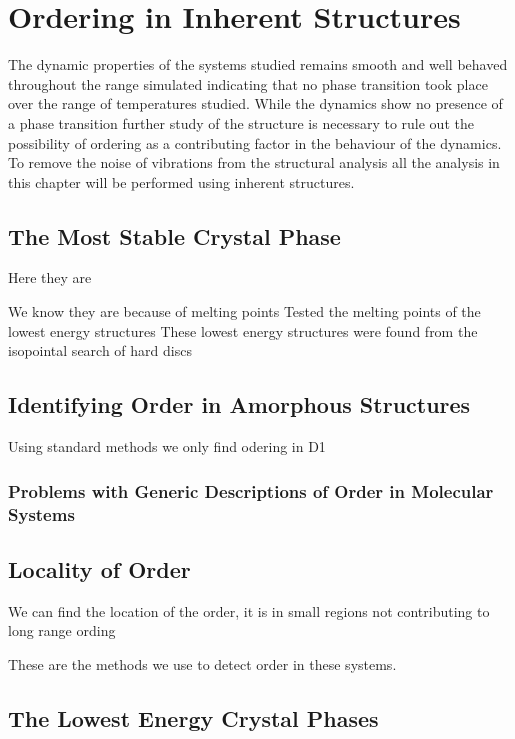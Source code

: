 \chapter{Ordering in Inherent Structures}
\label{sec:structure}

The dynamic properties of the systems studied remains smooth and well behaved throughout the range simulated indicating that no phase transition took place over the range of temperatures studied. While the dynamics show no presence of a phase transition further study of the structure is necessary to rule out the possibility of ordering as a contributing factor in the behaviour of the dynamics. To remove the noise of vibrations from the structural analysis all the analysis in this chapter will be performed using inherent structures.

\section{The Most Stable Crystal Phase}

Here they are

We know they are because of melting points
Tested the melting points of the lowest energy structures
These lowest energy structures were found from the isopointal search of hard discs

\section{Identifying Order in Amorphous Structures}

Using standard methods we only find odering in D1

\subsection{Problems with Generic Descriptions of Order in Molecular Systems}

\section{Locality of Order}

We can find the location of the order, it is in small regions not contributing to long range ording

These are the methods we use to detect order in these systems.


\section{The Lowest Energy Crystal Phases}

